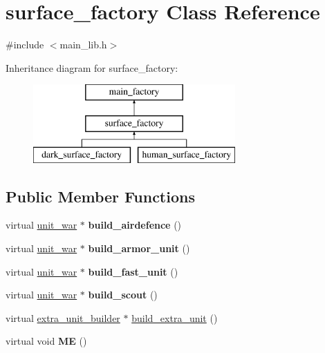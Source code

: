 \hypertarget{classsurface__factory}{}\section{surface\+\_\+factory Class Reference}
\label{classsurface__factory}


{\ttfamily \#include $<$main\+\_\+lib.\+h$>$}

Inheritance diagram for surface\+\_\+factory\+:\begin{figure}[H]
\begin{center}
\leavevmode
\includegraphics[height=3.000000cm]{classsurface__factory}
\end{center}
\end{figure}
\subsection*{Public Member Functions}
\begin{DoxyCompactItemize}
\item 
\mbox{\label{classsurface__factory_a67054d75afd077764781cd101529f40c}} 
virtual \mbox{\hyperlink{classunit__war}{unit\+\_\+war}} $\ast$ {\bfseries build\+\_\+airdefence} ()
\item 
\mbox{\label{classsurface__factory_a0ad51809e3b62f821a7e35858f2ebe64}} 
virtual \mbox{\hyperlink{classunit__war}{unit\+\_\+war}} $\ast$ {\bfseries build\+\_\+armor\+\_\+unit} ()
\item 
\mbox{\label{classsurface__factory_aadb3805043973d0f157e0d7198503cb6}} 
virtual \mbox{\hyperlink{classunit__war}{unit\+\_\+war}} $\ast$ {\bfseries build\+\_\+fast\+\_\+unit} ()
\item 
\mbox{\label{classsurface__factory_adeae2cd0024dd9422805623be9dfed39}} 
virtual \mbox{\hyperlink{classunit__war}{unit\+\_\+war}} $\ast$ {\bfseries build\+\_\+scout} ()
\item 
virtual \mbox{\hyperlink{classextra__unit__builder}{extra\+\_\+unit\+\_\+builder}} $\ast$ \mbox{\hyperlink{classsurface__factory_a7a75bc9c3cd6b38bfbdcd062498beffc}{build\+\_\+extra\+\_\+unit}} ()
\item 
\mbox{\label{classsurface__factory_ac6555c8d0ec21ea580c988a4739d0f96}} 
virtual void {\bfseries ME} ()
\end{DoxyCompactItemize}
